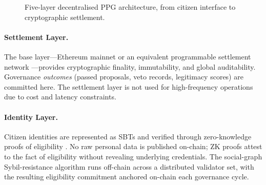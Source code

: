 \documentclass[12pt,a4paper,oneside]{report}
\begin{document}
\begin{figure}[htbp]
\centering
{}
\caption{Five-layer decentralised PPG architecture, from citizen interface to cryptographic settlement.}
\label{fig:dec_architecture}
\end{figure}

\paragraph{Settlement Layer.} The base layer---Ethereum mainnet or an equivalent programmable settlement network \citep{buterin2014ethereum}---provides cryptographic finality, immutability, and global auditability. Governance \emph{outcomes} (passed proposals, veto records, legitimacy scores) are committed here. The settlement layer is not used for high-frequency operations due to cost and latency constraints.

\paragraph{Identity Layer.} Citizen identities are represented as SBTs and verified through zero-knowledge proofs of eligibility \citep{boneh2020graduate}. No raw personal data is published on-chain; ZK proofs attest to the fact of eligibility without revealing underlying credentials. The social-graph Sybil-resistance algorithm runs off-chain across a distributed validator set, with the resulting eligibility commitment anchored on-chain each governance cycle.
\end{document}
